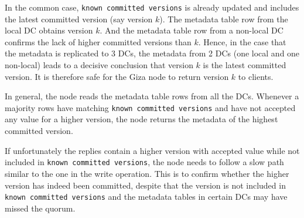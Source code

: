 In the common case,
{\tt known committed versions} is already updated and includes the latest committed version (say version $k$).
The metadata table row from the local DC obtains version $k$.
And the metadata table row from a non-local DC confirms the lack of higher committed versions than $k$.
Hence, in the case that the metadata is replicated to 3 DCs,
the metadata from 2 DCs (one local and one non-local) leads to a decisive conclusion that version $k$ is the latest committed version.
It is therefore safe for the Giza node to return version $k$ to clients.

In general, the \name node reads the metadata table rows from all the DCs.
Whenever a majority rows have matching {\tt known committed versions}
and have not accepted any value for a higher version, 
the \name node returns the metadata of the highest committed version.

If unfortunately the replies contain a higher version with accepted value while not included in {\tt known committed versions},
the \name node needs to follow a slow path similar to the one in the write operation.
This is to confirm whether the higher version has indeed been committed,
despite that the version is not included in {\tt known committed versions} and the metadata tables in certain DCs may have missed the quorum.



